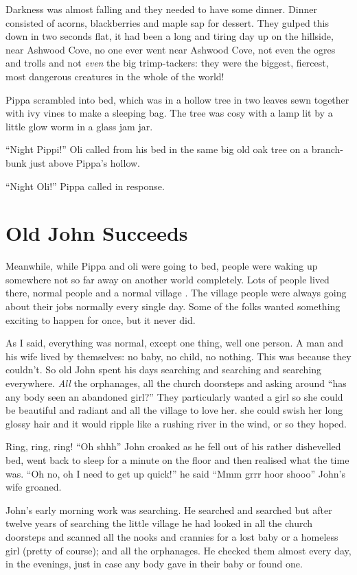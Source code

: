 Darkness was almost falling and they needed to have some dinner. Dinner
consisted of acorns, blackberries and maple sap for dessert. They gulped
this down in two seconds flat, it had been a long and tiring day up on
the hillside, near Ashwood Cove, no one ever went near Ashwood Cove, not
even the ogres and trolls and not \emph{even} the big trimp-tackers:
they were the biggest, fiercest, most dangerous creatures in the whole
of the world!

Pippa scrambled into bed, which was in a hollow tree in two leaves sewn
together with ivy vines to make a sleeping bag. The tree was cosy with a
lamp lit by a little glow worm in a glass jam jar.

``Night Pippi!'' Oli called from his bed in the same big old oak tree on
a branch-bunk just above Pippa's hollow.

``Night Oli!'' Pippa called in response.

\chapter{Old John Succeeds}

Meanwhile, while Pippa and oli were going to bed, people were waking up
somewhere not so far away on another world completely. Lots of people
lived there, normal people and a normal village . The village people
were always going about their jobs normally every single day. Some of
the folks wanted something exciting to happen for once, but it never
did.

As I said, everything was normal, except one thing, well one person. A
man and his wife lived by themselves: no baby, no child, no nothing.
This was because they couldn't. So old John spent his days searching and
searching and searching everywhere. \emph{All} the orphanages, all the
church doorsteps and asking around ``has any body seen an abandoned
girl?'' They particularly wanted a girl so she could be beautiful and
radiant and all the village to love her. she could swish her long glossy
hair and it would ripple like a rushing river in the wind, or so they
hoped.

Ring, ring, ring! ``Oh shhh'' John croaked as he fell out of his rather
dishevelled bed, went back to sleep for a minute on the floor and then
realised what the time was. ``Oh no, oh I need to get up quick!'' he
said ``Mmm grrr hoor shooo'' John's wife groaned.

John's early morning work was searching. He searched and searched but
after twelve years of searching the little village he had looked in all
the church doorsteps and scanned all the nooks and crannies for a lost
baby or a homeless girl (pretty of course); and all the orphanages. He
checked them almost every day, in the evenings, just in case any body
gave in their baby or found one.


